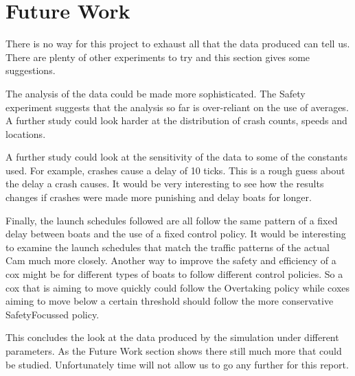 \section{Future Work}
There is no way for this project to exhaust all that the data produced can tell us. There are plenty of other experiments to try and this section gives some suggestions.

The analysis of the data could be made more sophisticated. The Safety experiment suggests that the analysis so far is over-reliant on the use of averages. A further study could look harder at the distribution of crash counts, speeds and locations.

A further study could look at the sensitivity of the data to some of the constants used. For example, crashes cause a delay of 10 ticks. This is a rough guess about the delay a crash causes. It would be very interesting to see how the results changes if crashes were made more punishing and delay boats for longer.

Finally, the launch schedules followed are all follow the same pattern of a fixed delay between boats and the use of a fixed control policy. It would be interesting to examine the launch schedules that match the traffic patterns of the actual Cam much more closely. Another way to improve the safety and efficiency of a cox might be for different types of boats to follow different control policies. So a cox that is aiming to move quickly could follow the Overtaking policy while coxes aiming to move below a certain threshold should follow the more conservative SafetyFocussed policy.

This concludes the look at the data produced by the simulation under different parameters. As the Future Work section shows there still much more that could be studied. Unfortunately time will not allow us to go any further for this report.
